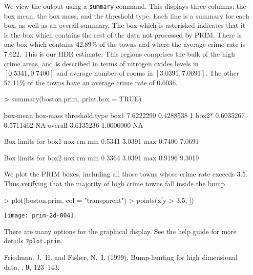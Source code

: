 \documentclass[a4paper,11pt]{article}
\begin{document}
We view the output using a \texttt{summary} command. This displays three
columns: the box mean, the box mass, and the threshold type. Each line is a summary
for each box, as well as an overall summary. The box which is asterisked
indicates that it is the box which contains the rest of the data not 
processed by PRIM.
There is one box which contains 42.89\% of the towns
and where the average crime rate is 7.622. This is our HDR estimate. 
This regions comprises the bulk
of the high crime areas, and is described in terms of 
nitrogen oxides levels in $[0.5341, 0.7400]$ 
and average number of rooms in $[3.0391, 7.0691]$.
The other 57.11\% of the
towns have an average crime rate of 0.6036.

\begin{Schunk}
\begin{Sinput}
> summary(boston.prim, print.box = TRUE)
\end{Sinput}
\begin{Soutput}
         box-mean  box-mass threshold.type
box1    7.6222290 0.4288538              1
box2*   0.6035267 0.5711462             NA
overall 3.6135236 1.0000000             NA

Box limits for box1
       nox     rm
min 0.5341 3.0391
max 0.7400 7.0691

Box limits for box2
       nox     rm
min 0.3364 3.0391
max 0.9196 9.3019
\end{Soutput}
\end{Schunk}

We plot the PRIM boxes, including 
all those towns whose crime rate exceeds 3.5. Thus 
verifying that the majority of high crime towns fall inside the
bump.
\begin{Schunk}
\begin{Sinput}
> plot(boston.prim, col = "transparent")
> points(x[y > 3.5, ])
\end{Sinput}
\end{Schunk}
\begin{center}
\texttt{[image: prim-2d-004]}
\end{center}
There are many options for the graphical display. See
the help guide for more details \texttt{?plot.prim}.







\begin{thebibliography}{}


Friedman, J.~H. and Fisher, N.~I. (1999).
\newblock Bump-hunting for high dimensional data.
, \textbf{9}, 123--143.


\end{thebibliography}

%
\end{document}
